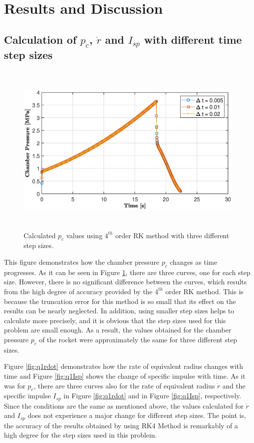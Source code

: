 \documentclass[letterpaper,12pt]{article}
\begin{document}
\section{Results and Discussion}
\subsection{Calculation of $p_c$, $\dot{r}$ and $I_{sp}$ with different time step sizes}

\begin{figure} [ht]
	\centering
	\includegraphics[height = 8.5cm]{graphs/q1_pc.eps}
	\caption{Calculated $p_c$ values using $4^{th}$ order RK method with three different step sizes.}
     \label{fig:q1pc}
\end{figure}

This figure demonstrates how the chamber pressure $p_c$ changes as time progresses. As it can be seen in 
Figure \ref{fig:q1pc}, there are three curves, one for each step size. However,
there is no significant difference between the curves, which results from the high degree of accuracy
provided by the $4^{th}$ order RK method. This is because the truncation error for this method is so
small that its effect on the results can be nearly neglected. In addition, using smaller step sizes
helps to calculate more precisely, and it is obvious that the step sizes used for this problem are small
enough. As a result, the values obtained for the chamber pressure $p_c$ of the rocket were approximately
the same for three different step sizes.

\vspace{1em}
Figure \ref{fig:q1rdot} demonstrates how the rate of equivalent radius changes with time and 
Figure \ref{fig:q1Isp} shows the change of specific impulse with time.
As it was for $p_c$, there are three curves also for the rate of equivalent radius
$\dot{r}$ and the specific impulse $I_{sp}$ in Figure \ref{fig:q1rdot} and in Figure \ref{fig:q1Isp}, respectively. 
Since the conditions are the same as mentioned above, the values calculated for $\dot{r}$ and $I_{sp}$ does not 
experience a major change for different step sizes. The point is, the accuracy of the results obtained by using RK4 Method
is remarkably of a high degree for the step sizes used in this problem.
\newpage
\end{document}
